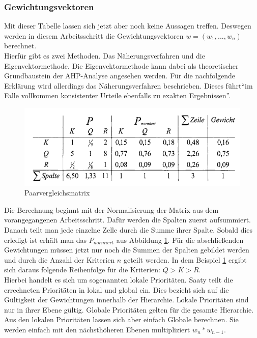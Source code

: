 \subsubsection{Gewichtungsvektoren}
Mit dieser Tabelle lassen sich jetzt aber noch keine Aussagen treffen. Deswegen werden in diesem Arbeitsschritt die Gewichtungsvektoren $w=(w_{1}, ..., w_{n})$ berechnet.\\
Hierfür gibt es zwei Methoden. Das Näherungsverfahren und die Eigenvektormethode. Die Eigenvektormethode kann dabei als theoretischer Grundbaustein der AHP-Analyse angesehen werden.\autocite[Vgl.][S.106]{Fink.2006} Für die nachfolgende Erklärung wird allerdings das Näherungsverfahren beschrieben. Dieses führt\enquote{im Falle vollkommen konsistenter Urteile ebenfalls zu exakten Ergebnissen}\autocite[S.106]{Fink.2006}.
\begin{figure}[h!]
	\centering
	\includegraphics[scale = 0.9]{img/Tabelle.png}
	\caption{Paarvergleichsmatrix}
	\label{img:table}
\end{figure}
Die Berechnung beginnt mit der Normalisierung der Matrix aus dem vorangegangenen Arbeitsschritt. Dafür werden die Spalten zuerst aufsummiert. Danach teilt man jede einzelne Zelle durch die Summe ihrer Spalte. Sobald dies erledigt ist erhält man das $P_{normiert}$ aus Abbildung \ref{img:table}. Für die abschließenden Gewichtungen müssen jetzt nur noch die Summen der Spalten gebildet werden und durch die Anzahl der Kriterien $n$ geteilt werden. In dem Beispiel \ref{img:table} ergibt sich daraus folgende Reihenfolge für die Kriterien: $Q > K > R$. \\
Hierbei handelt es sich um sogenannten lokale Prioritäten. Saaty teilt die errechneten Prioritäten in lokal und global ein.\autocite[Vgl.][S.16]{Saaty.2012} Dies bezieht sich auf die Gültigkeit der Gewichtungen innerhalb der Hierarchie. Lokale Prioritäten sind nur in ihrer Ebene gültig. Globale Prioritäten gelten für die gesamte Hierarchie. Aus den lokalen Prioritäten lassen sich aber einfach Globale berechnen. Sie werden einfach mit den nächsthöheren Ebenen multipliziert $w_n * w_{n-1}$\autocite[Vgl.][S.107]{Fink.2006}. 
